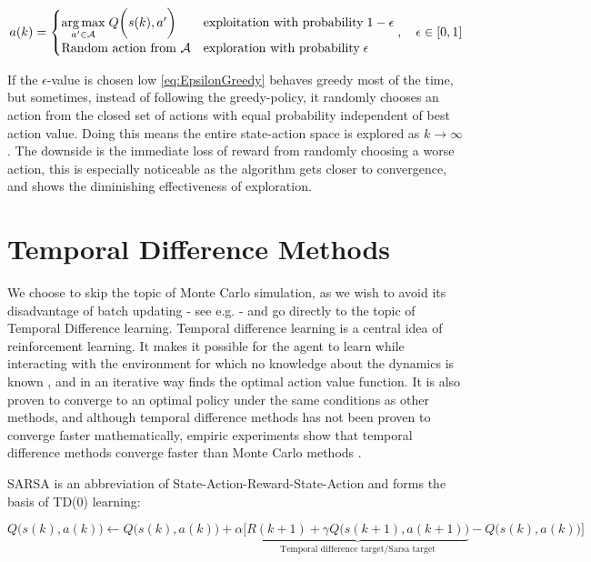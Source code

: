 \begin{equation}\label{eq:EpsilonGreedy}
	a(k) = 
	\begin{cases} 
		\underset{a'\in \mathcal{A}}{\arg\max} \; Q\bigg(s(k),a'\bigg) & \text{exploitation with probability} \; 1-\epsilon  \\
		\text{Random action from $ \mathcal{A} $} & \text{exploration with probability} \; \epsilon 
	\end{cases},\quad \epsilon \in [0,1]
\end{equation}

If the $\epsilon$-value is chosen low \cref{eq:EpsilonGreedy} behaves greedy most of the time, but sometimes, instead of following the greedy-policy, it randomly chooses an action from the closed set of actions with equal probability independent of best action value. Doing this means the entire state-action space is explored as $ k \rightarrow \infty $. The downside is the immediate loss of reward from randomly choosing a worse action, this is especially noticeable as the algorithm gets closer to convergence, and shows the diminishing effectiveness of exploration.	

\section{Temporal Difference Methods}\label{sec:TD-Methods}
We choose to skip the topic of Monte Carlo simulation, as we wish to avoid its disadvantage of batch updating  - see e.g. \cite{Busoniu2010, Sutton2020} - and go directly to the topic of Temporal Difference learning. Temporal difference learning is a central idea of reinforcement learning. It makes it possible for the agent to learn while interacting with the environment for which no knowledge about the dynamics is known \cite{DaMottaSallesBarreto2008}, and in an iterative way finds the optimal action value function. It is also proven to converge to an optimal policy under the same conditions as other methods, and although temporal difference methods has not been proven to converge faster mathematically, empiric experiments show that temporal difference methods converge faster than Monte Carlo methods \cite{Sutton2020}.

SARSA is an abbreviation of State-Action-Reward-State-Action and forms the basis of TD(0) learning:

\begin{equation}\label{eq:sarsa}
	Q\bigg(s(k),a(k)\bigg)\leftarrow Q\bigg(
	s(k),a(k)\bigg)+\alpha	 
	\Bigg[
	\underbrace{R(k+1)+\gamma Q\bigg(s(k+1),a(k+1)\bigg)}_{\text{Temporal difference target/Sarsa target}}
	-Q\bigg(s(k),a(k)\bigg)
	\Bigg]
\end{equation}

